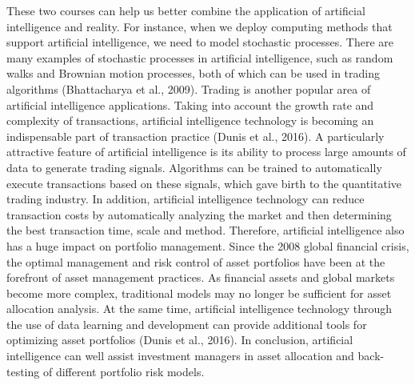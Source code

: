 \documentclass{article}
\begin{document}
    These two courses can help us better combine the application of artificial intelligence and reality. For instance, when we deploy computing methods that support artificial intelligence, we need to model stochastic processes. There are many examples of stochastic processes in artificial intelligence, such as random walks and Brownian motion processes, both of which can be used in trading algorithms (Bhattacharya et al., 2009). Trading is another popular area of artificial intelligence applications. Taking into account the growth rate and complexity of transactions, artificial intelligence technology is becoming an indispensable part of transaction practice (Dunis et al., 2016). A particularly attractive feature of artificial intelligence is its ability to process large amounts of data to generate trading signals. Algorithms can be trained to automatically execute transactions based on these signals, which gave birth to the quantitative trading industry. In addition, artificial intelligence technology can reduce transaction costs by automatically analyzing the market and then determining the best transaction time, scale and method. Therefore, artificial intelligence also has a huge impact on portfolio management. Since the 2008 global financial crisis, the optimal management and risk control of asset portfolios have been at the forefront of asset management practices. As financial assets and global markets become more complex, traditional models may no longer be sufficient for asset allocation analysis. At the same time, artificial intelligence technology through the use of data learning and development can provide additional tools for optimizing asset portfolios (Dunis et al., 2016). In conclusion, artificial intelligence can well assist investment managers in asset allocation and back-testing of different portfolio risk models.\\
    \\
\end{document}
